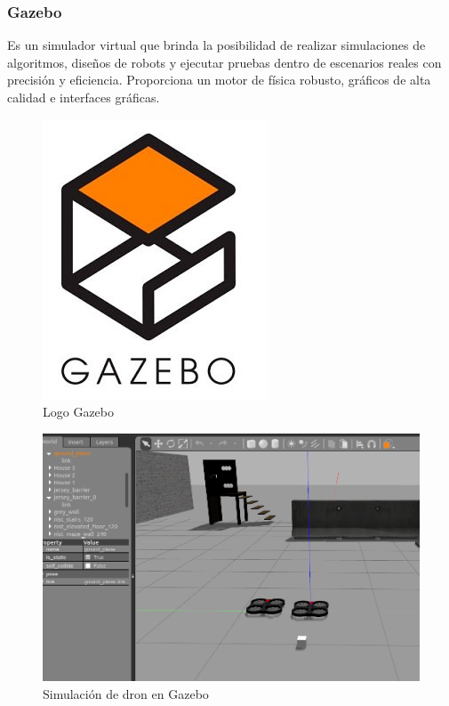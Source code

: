         \newpage    

            \subsubsection{Gazebo}
     Es un simulador virtual que brinda la posibilidad de realizar simulaciones de algoritmos, diseños de robots y ejecutar pruebas dentro de escenarios reales con precisión y eficiencia. Proporciona un motor de física robusto, gráficos de alta calidad e interfaces gráficas. 
        
        \begin{figure}[htb]
                \centering
                \includegraphics[width=0.3\linewidth]{Main/Chapter3/Images3/herramientas_4.png}
                \caption{Logo Gazebo}
                \label{f:Cap3_herramientas_4}
        \end{figure} 
    
        
        \begin{figure}[htb]
                \centering
                \includegraphics[width=0.98\linewidth]{Main/Chapter3/Images3/herramientas_3.png}
                \caption{Simulación de dron en Gazebo}
                \label{f:Cap3_herramientas_3}
        \end{figure}  

